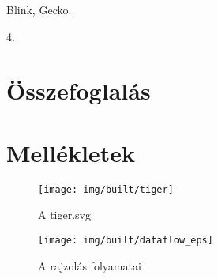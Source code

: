 \documentclass[12pt]{report}
\theoremstyle{definition}
\begin{document}
  \begin{description}[noitemsep]
    \item[Kulcsszavak] Blink, Gecko.
    \item[Becsült oldalszám] 4.
  \end{description}



    \chapter{Összefoglalás}



    \nocite{Foley:1990:CGP:83821}
    {}
    



    \chapter*{Mellékletek}


  \begin{figure}[!htb]
  \begin{center}
    \texttt{[image: img/built/tiger]}
  \end{center}
    \caption{\label{tiger} A tiger.svg}
  \end{figure}

  \begin{figure}[!htb]
  \begin{center}
    \texttt{[image: img/built/dataflow\_eps]}
  \end{center}
    \caption{\label{dataflow} A rajzolás folyamatai}
  \end{figure}
\end{document}
